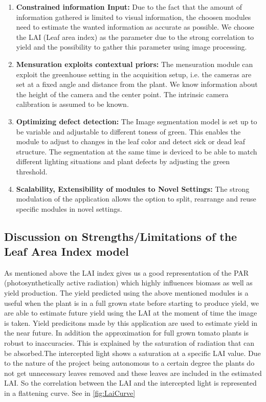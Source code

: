 \begin{enumerate}
    \item \textbf{Constrained information Input:} Due to the fact that the amount of information gathered is limited to visual information, the choosen modules need to estimate the wanted information as accurate as possible. We choose the LAI (Leaf area index) as the parameter due to the strong correlation to yield \cite{heuvelink2004effect} and the possibility to gather this parameter using image processing.

    \item \textbf{Mensuration exploits contextual priors:} The mensuration module can exploit the greenhouse setting in the acquisition setup, i.e. the cameras are set at a fixed angle and distance from the plant. We know information about the height of the camera and the center point. The intrinsic camera calibration is assumed to be known.

    \item \textbf{Optimizing defect detection:} The Image segmentation model is set up to be variable and adjustable to different toness of green. This enables the module to adjust to changes in the leaf color and detect sick or dead leaf structure. The segmentation at the same time is deviced to be able to match different lighting situations and plant defects by adjusting the green threshold.

    \item \textbf{Scalability, Extensibility of modules to Novel Settings:} The strong modulation of the application allows the option to split, rearrange and reuse specific modules in novel settings.
\end{enumerate}

\subsection{Discussion on Strengths/Limitations of the Leaf Area Index model}


As mentioned above the LAI index gives us a good representation of the PAR (photosynthetically active radiation) which highly influences biomass as well as yield production. \cite{hossain2017leaf} The yield predicted using the above mentioned modules is a useful when the plant is in a full grown state before starting to produce yield, we are able to estimate future yield using the LAI at the moment of time the image is taken. Yield predicitons made by this application are used to estimate yield in the near future. In addition the approximation for full grown tomato plants is robust to inaccuracies. This is explained by the saturation of radiation that can be absorbed.The intercepted light shows a saturation at a specific LAI value. Due to the nature of the project being autonomous to a certain degree the plants do not get unnecessary leaves removed and these leaves are included in the estimated LAI. So the correlation between the LAI and the intercepted light is represented in a flattening curve. See in \ref{fig:LaiCurve}\\

